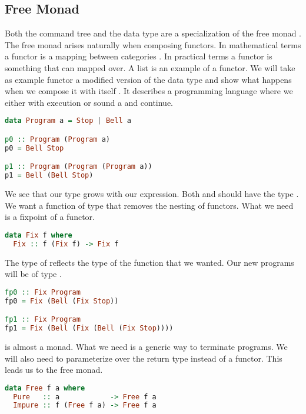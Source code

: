 \subsection{\label{subsection:freemonad}Free Monad}
Both the command tree and the  data type are a specialization of the free monad \autocite{swierstra2008data}. The free monad arises naturally when composing functors. In mathematical terms a functor is a mapping between categories \autocite{barr1990category}. In practical terms a functor is something that can mapped over. A list is an example of a functor. We will take as example functor a modified version of the  data type and show what happens when we compose it with itself \autocite{freemonadsforall}. It describes a programming language where we either  with execution or sound a  and continue.

\begin{lstlisting}[language=Haskell]
data Program a = Stop | Bell a

p0 :: Program (Program a)
p0 = Bell Stop

p1 :: Program (Program (Program a))
p1 = Bell (Bell Stop)
\end{lstlisting}

We see that our type grows with our expression. Both  and  should have the type . We want a function of type  that removes the nesting of functors. What we need is a fixpoint of a functor.

\begin{lstlisting}[language=Haskell]
data Fix f where
  Fix :: f (Fix f) -> Fix f
\end{lstlisting}

The type of  reflects the type of the function that we wanted. Our new programs will be of type .

\begin{lstlisting}[language=Haskell]
fp0 :: Fix Program
fp0 = Fix (Bell (Fix Stop))

fp1 :: Fix Program
fp1 = Fix (Bell (Fix (Bell (Fix Stop))))
\end{lstlisting}

 is almost a monad. What we need is a generic way to terminate programs. We will also need to parameterize over the return type instead of a functor. This leads us to the free monad.

\begin{lstlisting}[language=Haskell]
data Free f a where
  Pure   :: a            -> Free f a
  Impure :: f (Free f a) -> Free f a
\end{lstlisting}


